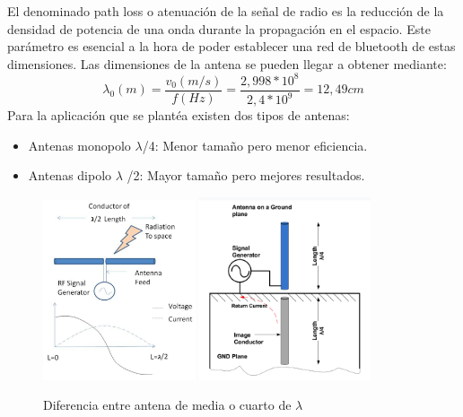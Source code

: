 \documentclass[a4paper ,12pt, onecolumn]{article}
\begin{document}
            El denominado path loss o atenuación de la señal de radio es la reducción de la densidad de potencia de una onda durante la 
            propagación en el espacio. Este parámetro es esencial a la hora de poder establecer una red de bluetooth de estas dimensiones.
            Las dimensiones de la antena se pueden llegar a obtener mediante:
            \begin{equation}
                \lambda_0(m)=\frac{v_0(m/s)}{f(Hz)} = \frac{2,998*10^8}{2,4*10^9} = 12,49 cm
            \end{equation}
            Para la aplicación que se plantéa existen dos tipos de antenas:
            \begin{itemize}
                \item  Antenas monopolo $\lambda$/4: Menor tamaño pero menor eficiencia. 
                \item  Antenas dipolo $\lambda$ /2: Mayor tamaño pero mejores resultados.
            \end{itemize}
            \begin{center}
                \begin{figure}[h]
                    \centering
                    \includegraphics[width=0.4\textwidth]{antenna_design.png}
                    \includegraphics[width=0.45\textwidth]{antenna_design_monopole.png}
                    \caption{Diferencia entre antena de media o cuarto de $\lambda$}
                    \label{fig:mesh8}
                \end{figure}
            \end{center}
\end{document}
